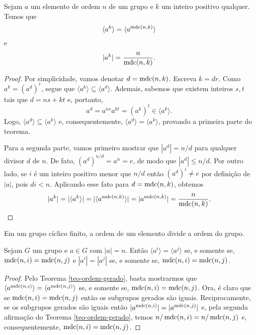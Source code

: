 %
\begin{theorem}
\label{teo-ordem-gerado}
    Sejam $a$ um elemento de ordem $n$ de um grupo e $k$ um inteiro positivo qualquer.
    Temos que
    \[
    \langle a^k \rangle = \langle a^{\operatorname{mdc}(n,k)} \rangle
    \]
    e
    \[
    |a^k| = \frac{n}{\operatorname{mdc}(n,k)}.
    \]
\end{theorem}
%
\begin{proof}
    Por simplicidade, vamos denotar $d = \operatorname{mdc}(n,k)$. Escreva $k = dr$. Como $a^k = (a^d)^r$, segue
    que $\langle a^k \rangle \subseteq \langle a^d \rangle$. Ademais, sabemos que existem inteiros
    $s,t$ tais que $d = ns + kt$ e, portanto,
    \[
    a^d = a^{ns}a^{kt} = (a^k)^t \in \langle a^k \rangle.
    \]
    Logo, $\langle a^d \rangle \subseteq \langle a^k \rangle$ e, consequentemente,
    $\langle a^d \rangle = \langle a^k \rangle$, provando a primeira parte do teorema.
    
    Para a segunda parte, vamos primeiro mostrar que $|a^d| = n/d$ para qualquer divisor $d$ de $n$.
    De fato, $(a^d)^{n/d} = a^n = e$, de modo que $|a^d| \leq n/d$. Por outro lado, se $i$ é um
    inteiro positivo menor que $n/d$ então $(a^d)^i\neq e$ por definição de $|a|$, pois $di < n$.
    Aplicando esse fato para $d = \operatorname{mdc}(n,k)$, obtemos
    \[
    |a^k| = |\langle a^k \rangle| = |\langle a^{\operatorname{mdc}(n,k)} \rangle| = |a^{\operatorname{mdc}(n,k)}| = \frac{n}{\operatorname{mdc}(n,k)}.
    \]
\end{proof}
%
\begin{corollary}
\label{cor-ordem-elemento-divide-ordem-grupo}
    Em um grupo cíclico finito, a ordem de um elemento divide a ordem do grupo.
\end{corollary}
%
\begin{corollary}
\label{cor-igualdade-subgrupos-gerados}
    Sejam $G$ um grupo e $a\in G$ com $|a|=n$. Então $\langle a^i \rangle = \langle a^j \rangle$
    se, e somente se, $\operatorname{mdc}(n,i) = \operatorname{mdc}(n,j)$ e $|a^i| = |a^j|$ se, e somente se, $\operatorname{mdc}(n,i) = \operatorname{mdc}(n,j)$.
\end{corollary}
%
\begin{proof}
    Pelo Teorema \ref{teo-ordem-gerado}, basta mostrarmos que 
    $\langle a^{\operatorname{mdc}(n,i)} \rangle = \langle a^{\operatorname{mdc}(n,j)} \rangle$ se, e somente se, $\operatorname{mdc}(n,i) = \operatorname{mdc}(n,j)$.
    Ora, é claro que se $\operatorname{mdc}(n,i) = \operatorname{mdc}(n,j)$ então os subgrupos gerados são iguais. Reciprocamente,
    se os subgrupos gerados são iguais então $|a^{\operatorname{mdc}(n,i)}| = |a^{\operatorname{mdc}(n,j)}|$ e, pela segunda afirmação
    do Teorema \ref{teo-ordem-gerado}, temos $n/\operatorname{mdc}(n,i) = n/\operatorname{mdc}(n,j)$ e, consequentemente,
    $\operatorname{mdc}(n,i) = \operatorname{mdc}(n,j)$.
\end{proof}
